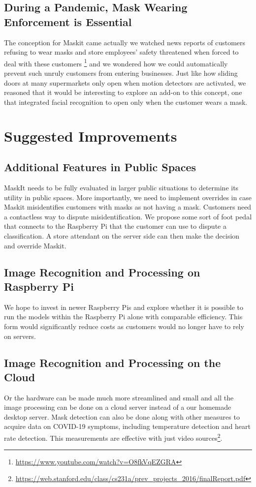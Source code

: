 \documentclass[conference, 12pt, onecolumn]{IEEEtran}
\begin{document}
\subsection{During a Pandemic, Mask Wearing Enforcement is Essential}
The conception for Maskit came actually we watched news reports of customers refusing to wear masks and store employees' safety threatened when forced to deal with these customers \footnote{\url{https://www.youtube.com/watch?v=O8fkVqEZGRA}} and we wondered how we could automatically prevent such unruly customers from entering businesses. Just like how sliding doors at many supermarkets only open when motion detectors are activated, we reasoned that it would be interesting to explore an add-on to this concept, one that integrated facial recognition to open only when the customer wears a mask. 
\section{Suggested Improvements}
\subsection{Additional Features in Public Spaces}
MaskIt needs to be fully evaluated in larger public situations to determine its utility in public spaces. More importantly, we need to implement overrides in case Maskit misidentifies customers with masks as not having a mask. Customers need a contactless way to dispute misidentification. We propose some sort of foot pedal that connects to the Raspberry Pi that the customer can use to dispute a classification. A store attendant on the server side can then make the decision and override Maskit.
\subsection{Image Recognition and Processing on Raspberry Pi}
We hope to invest in newer Raspberry Pis and explore whether it is possible to run the models within the Raspberry Pi alone with comparable efficiency. This form would significantly reduce costs as customers would no longer have to rely on servers.
\subsection{Image Recognition and Processing on the Cloud}
Or the hardware can be made much more streamlined and small and all the image processing can be done on a cloud server instead of a our homemade desktop server. Mask detection can also be done along with other measures to acquire data on COVID-19 symptoms, including temperature detection and heart rate detection. This measurements are effective with just video sources\footnote{\url{https://web.stanford.edu/class/cs231a/prev_projects_2016/finalReport.pdf}}.
\end{document}

